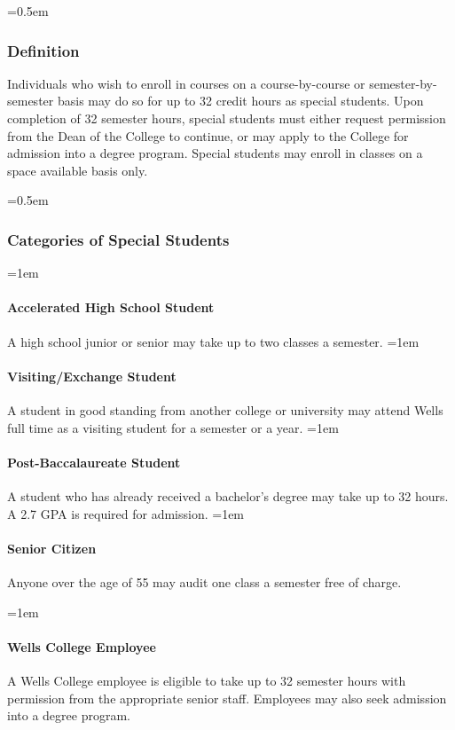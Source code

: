 \documentclass{manual}
\newcommand{\oldbreak}[1]{}
\let\oldsubsubsection\subsubsection
\renewcommand\subsubsection{\leftskip=0.5em\oldsubsubsection}
\let\oldparagraph\paragraph
\renewcommand\paragraph{\leftskip=1em\oldparagraph}
\begin{document}
\subsubsection{Definition}

Individuals who wish to enroll in courses on a course-by-course or semester-by-semester basis may do so for up to 32 credit hours as special students. Upon completion of 32 semester hours, special students must either request permission from the Dean of the College to continue, or may apply to the College for admission into a degree program. Special students may enroll in classes on a space available basis only.

\subsubsection{Categories of Special Students}\label{sub:CategoriesOfSpecialStudents}

\paragraph{Accelerated High School Student} A high school junior or senior may take up to two classes a semester.
\paragraph{Visiting/Exchange Student} A student in good standing from another college or university may attend Wells full time as a visiting student for a semester or a year.
\paragraph{Post-Baccalaureate Student} A student who has already received a bachelor's degree may take up to 32 hours. A 2.7 GPA is required for admission. 
\paragraph{Senior Citizen} Anyone over the age of 55 may audit one class a semester free of charge.

\oldbreak{X-1}

\paragraph{Wells College Employee}\label{par:employeeClasses} A Wells College employee is eligible to take up to 32 semester hours with permission from the appropriate senior staff. Employees may also seek admission into a degree program.
\end{document}
